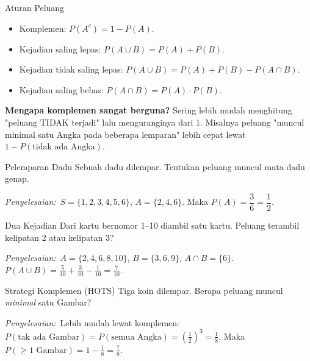 \documentclass[11pt,a4paper]{report}
\theoremstyle{gaya}
\newcommand{\jawab}{\par\smallskip\noindent\textit{\textcolor{oranye}{Penyelesaian:}}\ }
\begin{document}
\begin{konsep}{Aturan Peluang}
\begin{itemize}[leftmargin=*,topsep=2pt]
  \item Komplemen: $P(A^c) = 1 - P(A)$.
  \item Kejadian saling lepas: $P(A \cup B) = P(A) + P(B)$.
  \item Kejadian tidak saling lepas: $P(A\cup B) = P(A)+P(B)-P(A\cap B)$.
  \item Kejadian saling bebas: $P(A\cap B)=P(A)\cdot P(B)$.
\end{itemize}
\end{konsep}

\textbf{Mengapa komplemen sangat berguna?} Sering lebih mudah menghitung "peluang TIDAK terjadi" lalu menguranginya dari 1. Misalnya peluang "muncul minimal satu Angka pada beberapa lemparan" lebih cepat lewat $1-P(\text{tidak ada Angka})$.

\begin{contoh}{Pelemparan Dadu}
Sebuah dadu dilempar. Tentukan peluang muncul mata dadu genap.

\jawab $S = \{1,2,3,4,5,6\}$, $A = \{2,4,6\}$. Maka $P(A) = \dfrac{3}{6} = \dfrac12.$
\end{contoh}

\begin{contoh}{Dua Kejadian}
Dari kartu bernomor 1--10 diambil satu kartu. Peluang terambil kelipatan 2 atau kelipatan 3?

\jawab $A=\{2,4,6,8,10\}$, $B=\{3,6,9\}$, $A\cap B = \{6\}$.
$P(A\cup B) = \tfrac{5}{10}+\tfrac{3}{10}-\tfrac{1}{10} = \tfrac{7}{10}.$
\end{contoh}

\begin{contoh}{Strategi Komplemen (HOTS)}
Tiga koin dilempar. Berapa peluang muncul \emph{minimal} satu Gambar?

\jawab Lebih mudah lewat komplemen: $P(\text{tak ada Gambar})=P(\text{semua Angka})=\left(\tfrac12\right)^3=\tfrac18$. Maka $P(\ge1\text{ Gambar})=1-\tfrac18=\tfrac78$.
\end{contoh}
\end{document}
